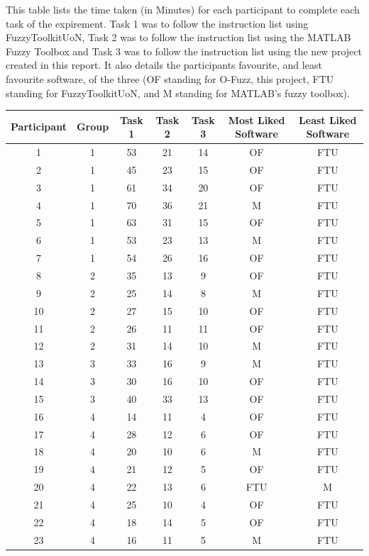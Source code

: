 \noindent 
This table lists the time taken (in Minutes) for each participant to complete each task of the expirement. Task 1 was to follow the instruction list using FuzzyToolkitUoN, Task 2 was to follow the instruction list using the MATLAB Fuzzy Toolbox and Task 3 was to follow the instruction list using the new project created in this report. It also details the participants favourite, and least favourite software, of the three (OF standing for O-Fuzz, this project, FTU standing for FuzzyToolkitUoN, and M standing for MATLAB's fuzzy toolbox).\ \\
\begin{changemargin}{-1cm}{-1cm}
\begin{tabular}{ccccccc}
\hline
Participant	&	Group	&	Task 1	&	Task 2	&	Task 3	&	Most Liked Software	&	Least Liked Software 	\\
\hline
1			&	1		&	53		&	21		&	14		&	OF					&	FTU						\\	
2			&	1		&	45		&	23		&	15		&	OF					&	FTU						\\
3			&	1		&	61		&	34		&	20		&	OF					&	FTU						\\	
4			&	1		&	70		&	36		&	21		&	M					&	FTU						\\	
5			&	1		&	63		&	31		&	15		&	OF					&	FTU						\\		
6			&	1		&	53		&	23		&	13		&	M					&	FTU						\\	
7			&	1		&	54		&	26		&	16		&	OF					&	FTU						\\	
8			&	2		&	35		&	13		&	9		&	OF					&	FTU						\\		
9			&	2		&	25		&	14		&	8		&	M					&	FTU						\\	
10			&	2		&	27		&	15		&	10		&	OF					&	FTU						\\			
11			&	2		&	26		&	11		&	11		&	OF					&	FTU						\\		
12			&	2		&	31		&	14		&	10		&	M					&	FTU						\\		
13			&	3		&	33		&	16		&	9		&	M					&	FTU						\\	
14			&	3		&	30		&	16		&	10		&	OF					&	FTU						\\			
15			&	3		&	40		&	33		&	13		&	OF					&	FTU						\\			
16			&	4		&	14		&	11		&	4 		&	OF					&	FTU						\\		
17			&	4		&	28		&	12		&	6 		&	OF					&	FTU						\\			
18			&	4		&	20		&	10		&	6 		&	M					&	FTU						\\	
19			&	4		&	21		&	12		&	5 		&	OF					&	FTU						\\			
20			&	4		&	22		&	13		&	6 		&	FTU					&	M 						\\			
21			&	4		&	25		&	10		&	4 		&	OF					&	FTU						\\		
22			&	4 		&	18		&	14		&	5 		&	OF					&	FTU						\\
23			&	4 		&	16		&	11		&	5 		&	M					&	FTU						\\
\end{tabular}			
\end{changemargin}
\newpage 
